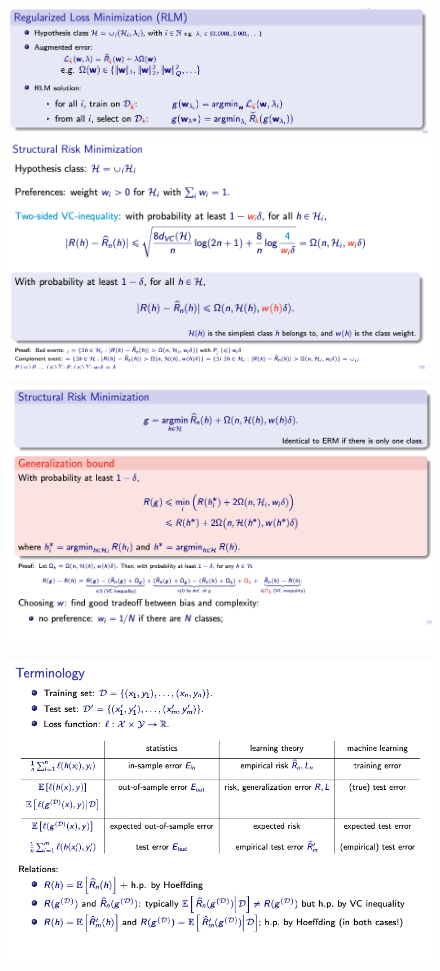 \begin{figure}[H]
    \centering
\includegraphics[width=1\linewidth]{img/RLM.png}
\includegraphics[width=0.75\linewidth]{img/srm-2side.png}    
\includegraphics[width=0.75\linewidth]{img/srm2.png}
\end{figure}

\begin{figure}[H]
    \centering
\includegraphics[width=0.55\linewidth]{img/terminology_3.png}

\end{figure}

